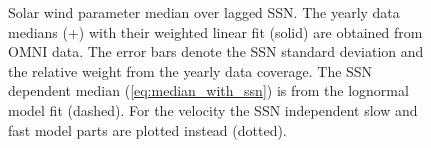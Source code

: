 \begin{figure}
	\caption{Solar wind parameter median over lagged SSN. The yearly data medians (+) with their weighted linear fit (solid) are obtained from OMNI data. The error bars denote the SSN standard deviation and the relative weight from the yearly data coverage. The SSN dependent median (\ref{eq:median_with_ssn}) is from the lognormal model fit (dashed). For the velocity the SSN independent slow and fast model parts are plotted instead (dotted).}
	\label{fig:OMNI_yearly_BVNTvsSSN}
\end{figure}

